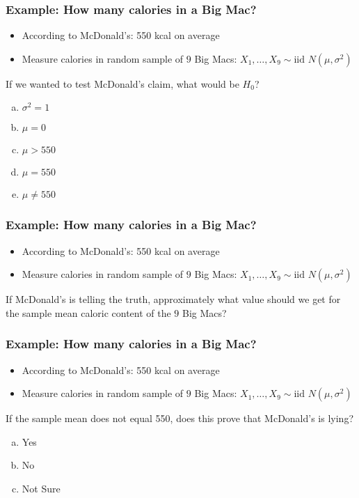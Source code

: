 \documentclass{beamer}
\begin{document}
\begin{frame}[t]
	\frametitle{Example: How many calories in a Big Mac? }
\begin{itemize}
	\item According to McDonald's: 550 kcal on average
	\item Measure calories in random sample of $9$ Big Macs: $X_1, \hdots, X_{9} \sim \mbox{iid } N(\mu, \sigma^2)$
\end{itemize}

\vspace{1em}

\alert{If we wanted to test McDonald's claim, what would be $H_0$?}
\begin{enumerate}[(a)]
	\item $\sigma^2 = 1$
	\item $\mu = 0$
	\item $\mu > 550$ 
	\item $\mu = 550$
	\item $\mu \neq 550$
\end{enumerate}
\end{frame}
\begin{frame}[t]
	\frametitle{Example: How many calories in a Big Mac? }
\begin{itemize}
	\item According to McDonald's: 550 kcal on average
	\item Measure calories in random sample of $9$ Big Macs: $X_1, \hdots, X_{9} \sim \mbox{iid } N(\mu, \sigma^2)$
\end{itemize}

\vspace{1em}

\alert{If McDonald's is telling the truth, approximately what value should we get for the sample mean caloric content of the $9$ Big Macs?} 
\end{frame}
\begin{frame}[t]
	\frametitle{Example: How many calories in a Big Mac? }
\begin{itemize}
	\item According to McDonald's: 550 kcal on average
	\item Measure calories in random sample of $9$ Big Macs: $X_1, \hdots, X_{9} \sim \mbox{iid } N(\mu, \sigma^2)$
\end{itemize}

\vspace{1em}

\alert{If the sample mean does not equal 550, does this prove that McDonald's is lying?}
\begin{enumerate}[(a)]
	\item Yes
	\item No
	\item Not Sure
\end{enumerate}
\end{frame}
\end{document}
